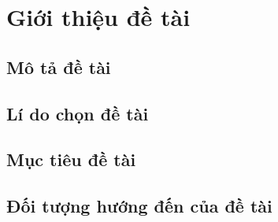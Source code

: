 \section{Giới thiệu đề tài}
\subsection{Mô tả đề tài}
\subsection{Lí do chọn đề tài}
\subsection{Mục tiêu đề tài}
\subsection{Đối tượng hướng đến của đề tài}